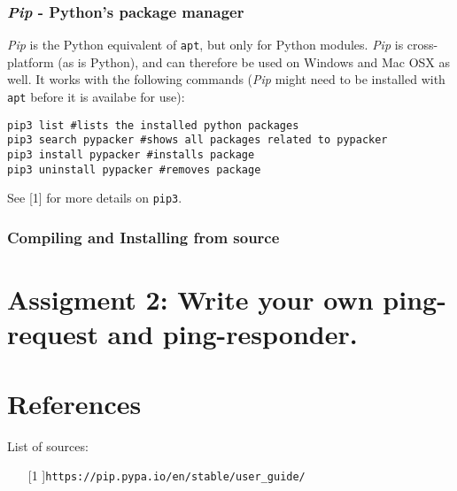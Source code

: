\documentclass[a4paper]{article}
\begin{document}
\subsubsection{\emph{Pip} - Python's package manager} 
\emph{Pip} is the Python equivalent of \texttt{apt}, but only for Python modules. \emph{Pip} is cross-platform (as is Python), and can therefore be used on Windows and Mac OSX as well. 
It works with the following commands (\emph{Pip} might need to be installed with \texttt{apt} before it is availabe for use): 

\begin{lstlisting}
pip3 list #lists the installed python packages
pip3 search pypacker #shows all packages related to pypacker
pip3 install pypacker #installs package
pip3 uninstall pypacker #removes package
\end{lstlisting}

See [1] for more details on \texttt{pip3}.

\subsubsection{Compiling and Installing from source}

\section{Assigment 2: Write your own ping-request and ping-responder. }


\section{References}

List of sources:

\begin{enumerate}

    \item[[1]]{\verb|https://pip.pypa.io/en/stable/user_guide/|}
    
\end{enumerate}
\end{document}
